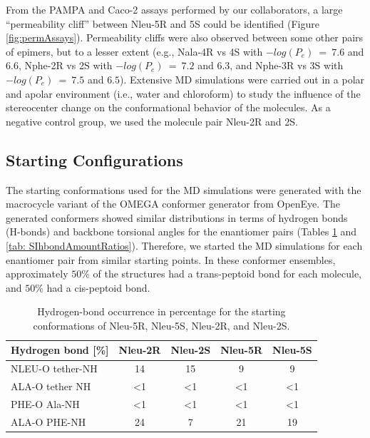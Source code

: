 From the PAMPA and Caco-2 assays performed by our collaborators,\cite{Comeau2021} a large ``permeability cliff''  between Nleu-5R and 5S could be identified (Figure \ref{fig:permAssays}). Permeability cliffs were also observed between some other pairs of epimers, but to a lesser extent (e.g., Nala-4R vs 4S with $−log(P_e)$~=~$7.6$ and $6.6$, Nphe-2R vs 2S with $−log(P_e)$~=~$7.2$ and $6.3$, and Nphe-3R vs 3S with $−log(P_e)$~=~$7.5$ and $6.5$). 
Extensive MD simulations were carried out in a polar and apolar environment (i.e., water and chloroform) to study the influence of the stereocenter change on the conformational behavior of the molecules. As a negative control group, we used the molecule pair Nleu-2R and 2S. 

\FloatBarrier

\subsection{Starting Configurations} 
The starting conformations used for the MD simulations were generated with the macrocycle variant of the OMEGA conformer generator from OpenEye.  \cite{Hawkins2012, Hawkins2010, Poongavanam2018}
The generated conformers showed similar distributions in terms of hydrogen bonds (H-bonds) and backbone torsional angles for the enantiomer pairs (Tables \ref{tab: SIhbondRatios} and \ref{tab: SIhbondAmountRatios}).
Therefore, we started the MD simulations for each enantiomer pair from similar starting points.
In these conformer ensembles, approximately $50\%$ of the structures had a trans-peptoid bond for each molecule, and $50\%$ had a cis-peptoid bond.

\begin{table}[h!]
\centering
\caption{Hydrogen-bond occurrence in percentage for the starting conformations of Nleu-5R, Nleu-5S, Nleu-2R, and Nleu-2S.}
\label{tab: SIhbondRatios}
  \begin{adjustbox}{max width=\textwidth}
  \begin{tabular}{lcccc}
Hydrogen bond {[}\%{]} & Nleu-2R      & Nleu-2S      & Nleu-5R      & Nleu-5S      \\
\hline
NLEU-O tether-NH       & 14         & 15         &  9           & 9        \\
ALA-O tether NH        & \textless{}1 & \textless{}1  & \textless{}1  & \textless{}1 \\
PHE-O Ala-NH           & \textless{}1 & \textless{}1 & \textless{}1  & \textless{}1 \\
ALA-O PHE-NH           & 24           & 7            & 21 & 19 \\
    \hline
\end{tabular}%
\end{adjustbox}
\end{table}


